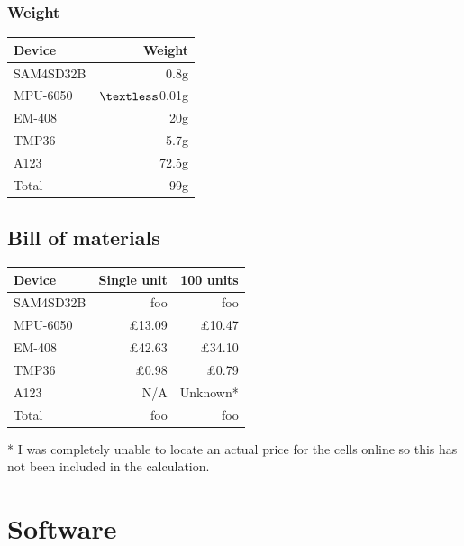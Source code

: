 \documentclass[a4paper, twoside]{article}
\begin{document}
\subsubsection{Weight}
\begin{tabular}{|l|r|}
	\hline
	\textbf{Device} & \textbf{Weight} \\
	\hline
	\hline
	SAM4SD32B & 0.8g \\
	MPU-6050 & $\textless$0.01g \\
	EM-408 & 20g \\
	TMP36 & 5.7g \\
	A123 & 72.5g \\
	\hline
	\hline
	Total & 99g \\
	\hline
\end{tabular}

\subsection{Bill of materials} %

\begin{tabular}{|l|r|r|}
	\hline
	\textbf{Device} & \textbf{Single unit} & \textbf{100 units} \\
	\hline
	\hline
	SAM4SD32B & foo & foo \\
	MPU-6050 & \pounds13.09 & \pounds10.47 \\
	EM-408 & \pounds42.63 & \pounds34.10 \\
	TMP36 & \pounds0.98 & \pounds0.79 \\
	A123 & N/A & Unknown* \\
	\hline
	\hline
	Total & foo & foo \\
	\hline
\end{tabular}

* I was completely unable to locate an actual price for the cells online so this
has not been included in the calculation. 

\clearpage
\section{Software}
\end{document}
